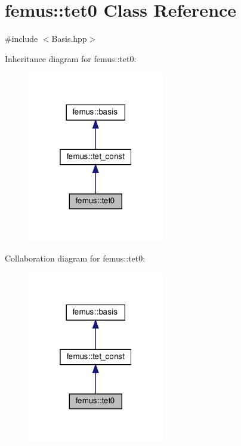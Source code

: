 \hypertarget{classfemus_1_1tet0}{}\section{femus\+:\+:tet0 Class Reference}
\label{classfemus_1_1tet0}


{\ttfamily \#include $<$Basis.\+hpp$>$}



Inheritance diagram for femus\+:\+:tet0\+:
\nopagebreak
\begin{figure}[H]
\begin{center}
\leavevmode
\includegraphics[width=169pt]{classfemus_1_1tet0__inherit__graph}
\end{center}
\end{figure}


Collaboration diagram for femus\+:\+:tet0\+:
\nopagebreak
\begin{figure}[H]
\begin{center}
\leavevmode
\includegraphics[width=169pt]{classfemus_1_1tet0__coll__graph}
\end{center}
\end{figure}
